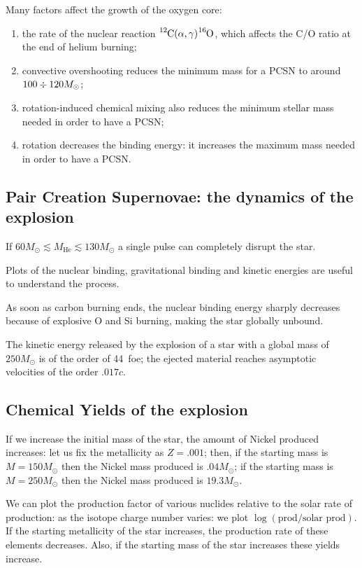 \documentclass[main.tex]{subfiles}
\begin{document}
Many factors affect the growth of the oxygen core: 
\begin{enumerate}
    \item the rate of the nuclear reaction \(\ce{^{12}C}(\alpha , \gamma ) \ce{^{16}O}\), which affects the C/O ratio at the end of helium burning;
    \item convective overshooting reduces the minimum mass for a PCSN to around \(100 \divisionsymbol 120M_{\odot}\);
    \item rotation-induced chemical mixing also reduces the minimum stellar mass needed in order to have a PCSN;
    \item rotation decreases the binding energy: it increases the maximum mass needed in order to have a PCSN.
\end{enumerate}

\subsection{Pair Creation Supernovae: the dynamics of the explosion}

If \(60 M_{\odot} \lesssim  M _{\text{He}} \lesssim 130M_{\odot}\) a single pulse can completely disrupt the star. 

Plots of the nuclear binding, gravitational binding and kinetic energies are useful to understand the process. 

As soon as carbon burning ends, the nuclear binding energy sharply decreases because of explosive O and Si burning, making the star globally unbound. 

The kinetic energy released by the explosion of a star with a global mass of \(250M_{\odot}\) is of the order of \SI{44}{foe}; the ejected material reaches asymptotic velocities of the order \(\num{.017}c\).

\subsection{Chemical Yields of the explosion}

If we increase the initial mass of the star, the amount of Nickel produced increases: let us fix the metallicity as \(Z = \num{.001}\); then, if the starting mass is \(M = 150M_{\odot}\) then the Nickel mass produced is \(\num{.04}M_{\odot}\); if the starting mass is \(M = 250M_{\odot}\) then the Nickel mass produced is \(\num{19.3}M_{\odot}\).

We can plot the production factor of various nuclides relative to the solar rate of production: as the isotope charge number varies: we plot \(\log (\text{prod} / \text{solar prod})\).
If the starting metallicity of the star increases, the production rate of these elements decreases.
Also, if the starting mass of the star increases these yields increase.
\end{document}
